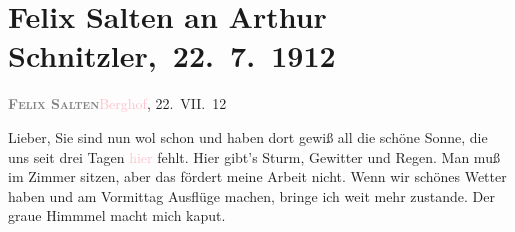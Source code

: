 

\renewcommand{\erwaehntePersonen}{Personen: Lili Cappellini, Samuel Fischer, Hedwig Fischer, Karl Goldmark, Felix Salten, Olga Schnitzler, Heinrich Schnitzler}
\renewcommand{\erwaehnteInstitutionen}{Institutionen: K. u. k. Zensurstelle}
\renewcommand{\erwaehnteOrte}{Orte: Berghof, Brijuni, Unterach am Attersee}
\renewcommand{\erwaehnteWerke}{Werke: Professor Bernhardi. Komödie in fünf Akten}
\section[ Felix Salten an Arthur Schnitzler, 22. 7. 1912]{Felix Salten an Arthur Schnitzler, 22. 7. 1912}
\nopagebreak{}
\rehead{ }\normalsize\beginnumbering{}
\toendnotes[C]{\smallbreak\pagebreak[2]}
\toendnotes[C]{\smallbreak}
\pstart
           \noindent{}{\pb}\textcolor{gray}{\textbf{\textsc{Felix Salten}}}\hfill \textcolor{pink}{Berghof}{}\ledrightnote{\textcolor{pink}{Berghof}}, 22. VII. 12\pend
           
\pstart{}Lieber,\pend
\pstart
           Sie sind nun wol schon \label{K_L03558-1v}\label{K_L03558-1h} und haben dort gewiß all die schöne Sonne, die uns seit drei Tagen \textcolor{pink}{hier}{}\ledrightnote{{$\rightarrow$}\textcolor{pink}{Unterach am Attersee}} fehlt. Hier gibt’s Sturm,
               Gewitter und Regen. Man muß im Zimmer sitzen, aber das fördert meine Arbeit nicht.
               Wenn wir schönes Wetter haben und am Vormittag Ausflüge machen, bringe ich weit mehr
               zustande. Der graue Himmmel macht mich kaput.\pend
           
